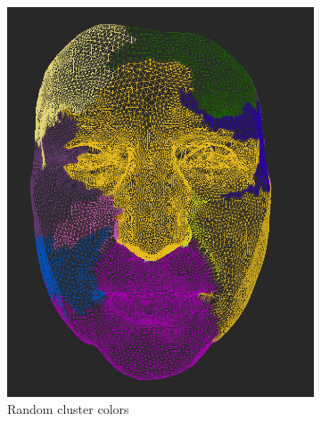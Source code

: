 \begin{figure}[h]
\centering
	\begin{subfigure}{0.3\textwidth}
	\includegraphics[width=\textwidth]{./img/meshdiff-clustercolor-random.PNG}
    \caption{Random cluster colors}
    \label{fig:meshdiff_clustercolor_random}
	\end{subfigure}
    \qquad
    \begin{subfigure}{0.3\textwidth}

\end{subfigure}
\end{figure}
